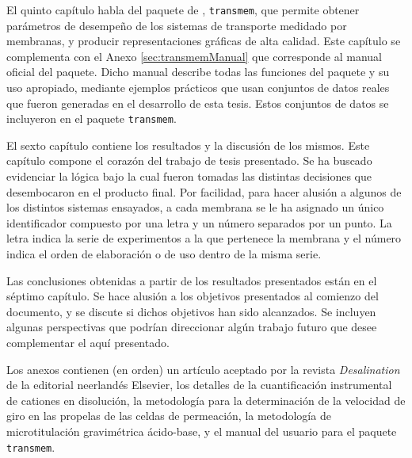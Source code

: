 El quinto capítulo habla del paquete de \R, \verb|transmem|, que permite obtener parámetros de desempeño de los sistemas de transporte medidado por membranas, y producir representaciones gráficas de alta calidad. Este capítulo se complementa con el Anexo \ref{sec:transmemManual} que corresponde al manual oficial del paquete. Dicho manual describe todas las funciones del paquete y su uso apropiado, mediante ejemplos prácticos que usan conjuntos de datos reales que fueron generadas en el desarrollo de esta tesis. Estos conjuntos de datos se incluyeron en el paquete \verb|transmem|. 

El sexto capítulo contiene los resultados y la discusión de los mismos. Este capítulo compone el corazón del trabajo de tesis presentado. Se ha buscado evidenciar la lógica bajo la cual fueron tomadas las distintas decisiones que desembocaron en el producto final. Por facilidad, para hacer alusión a algunos de los distintos sistemas ensayados, a cada membrana se le ha asignado un único identificador compuesto por una letra y un número separados por un punto. La letra indica la serie de experimentos a la que pertenece la membrana y el número indica el orden de elaboración o de uso dentro de la misma serie. 

Las conclusiones obtenidas a partir de los resultados presentados están en el séptimo capítulo. Se hace alusión a los objetivos presentados al comienzo del documento, y se discute si dichos objetivos han sido alcanzados. Se incluyen algunas perspectivas que podrían direccionar algún trabajo futuro que desee complementar el aquí presentado. 

Los anexos contienen (en orden) un artículo aceptado por la revista \textit{Desalination} de la editorial neerlandés Elsevier, los detalles de la cuantificación instrumental de cationes en disolución, la metodología para la determinación de la velocidad de giro en las propelas de las celdas de permeación, la metodología de microtitulación gravimétrica ácido-base, y el manual del usuario para el paquete \verb|transmem|.
\clearpage
{}
